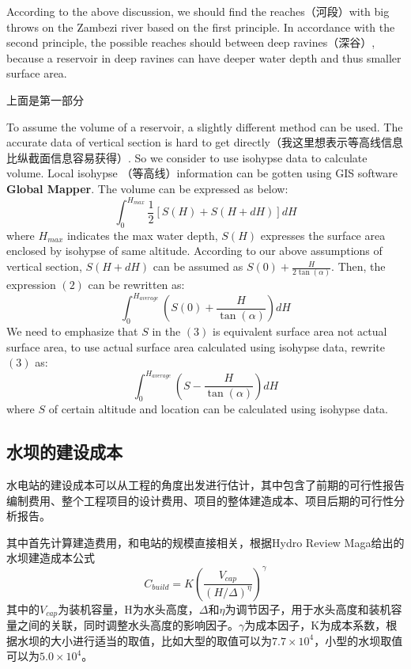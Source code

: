 \documentclass[nocover]{cumcmart}
\begin{document}
According to the above discussion, we should find the reaches（河段）with big throws on the Zambezi river based on the first principle. In accordance with the second principle, the possible reaches should between deep ravines（深谷）, because a reservoir in deep ravines can have deeper water depth and thus smaller surface area.
  
上面是第一部分

To assume the volume of a reservoir, a slightly different method can be used. The accurate data of vertical section is hard to get directly（我这里想表示等高线信息比纵截面信息容易获得）. So we consider to use isohypse data to calculate volume. Local isohypse （等高线）information can be gotten using GIS software \textbf{Global Mapper}. The volume can be expressed as below:
\begin{equation}\int_{0}^{H_{max}}\frac{1}{2}\left[S\left(H\right) + S\left(H + dH\right)\right]dH\end{equation}
where $H_{max}$ indicates the max water depth, $S\left(H\right)$ expresses the surface area enclosed by isohypse of same altitude. According to our above assumptions of vertical section, $S\left(H + dH\right)$ can be assumed as $S\left(0\right) + \frac{H}{2\tan\left(\alpha\right)}$. Then, the expression $\left(2\right)$ can be rewritten as:
\begin{equation}\int_{0}^{H_{average}}\left(S(0) + \frac{H}{\tan\left(\alpha\right)}\right)dH\end{equation}
We need to emphasize that $S$ in the $\left(3\right)$ is equivalent surface area not actual surface area, to use actual surface area calculated using isohypse data, rewrite $\left(3\right)$ as:
\begin{equation}\int_{0}^{H_{average}}\left(S - \frac{H}{\tan\left(\alpha\right)}\right)dH
\end{equation}
where $S$ of certain altitude and location can be calculated using isohypse data.

\newpage

\subsection{水坝的建设成本}
水电站的建设成本可以从工程的角度出发进行估计，其中包含了前期的可行性报告编制费用、整个工程项目的设计费用、项目的整体建造成本、项目后期的可行性分析报告。

其中首先计算建造费用，和电站的规模直接相关，根据Hydro Review Maga给出的水坝建造成本公式
\begin{equation}
C_{build} = K(\frac{V_{cap}}{(H/\Delta)^{\eta}})^{\gamma}
\end{equation}
其中的$V_{cap}$为装机容量，H为水头高度，$\Delta$和$\eta$为调节因子，用于水头高度和装机容量之间的关联，同时调整水头高度的影响因子。$\gamma$为成本因子，K为成本系数，根据水坝的大小进行适当的取值，比如大型的取值可以为$7.7\times10^4$，小型的水坝取值可以为$5.0 \times 10^4$。
\end{document}
